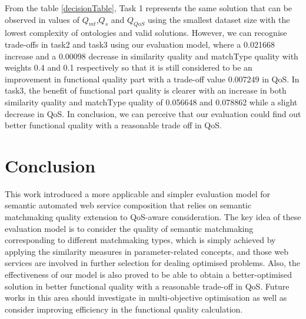 \documentclass{llncs}
\begin{document}
From the table \ref{decisionTable}, Task 1 represents the same solution that can be observed in values of  $Q_{mt}$,$Q_{s}$ and $Q_{QoS}$ using the smallest dataset size with the lowest complexity of ontologies and valid solutions. However, we can recognise trade-offs in task2 and task3 using our evaluation model, where a 0.021668 increase and a 0.00098 decrease in similarity quality and matchType quality with weights 0.4 and 0.1 respectively so that it is still considered to be an improvement in functional quality part with a trade-off value 0.007249 in QoS. In task3, the benefit of functional part quality is clearer with an increase in both similarity quality and matchType quality of 0.056648 and 0.078862 while a slight decrease in QoS.  In conclusion, we can perceive that our evaluation could find out better functional quality with a reasonable trade off in QoS.

\section{Conclusion}\label{conclusion}
This work introduced a more applicable and simpler evaluation model for semantic automated web service composition that relies on semantic matchmaking quality extension to QoS-aware consideration. The key idea of these evaluation model is to consider the quality of semantic matchmaking corresponding to different matchmaking types, which is simply achieved by applying the similarity measures in parameter-related concepts, and those web services are involved in further selection for dealing optimised problems. Also, the effectiveness of our model is also proved to be able to obtain a better-optimised solution in better functional quality with a reasonable trade-off in QoS. Future works in this area should investigate in multi-objective optimisation as well as consider improving efficiency in the functional quality calculation.


\end{document}
